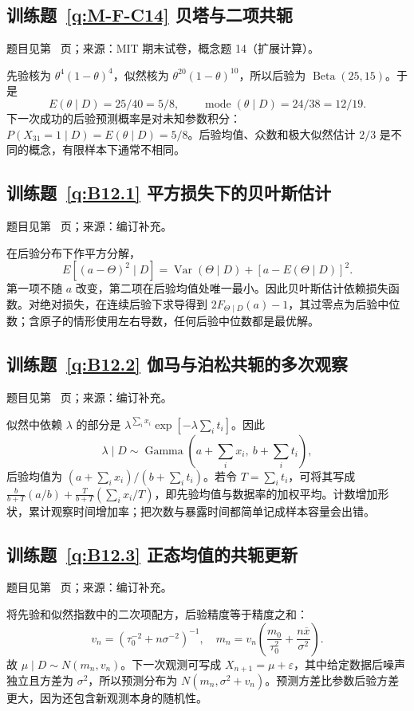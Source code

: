 \subsection*{训练题~\ref{q:M-F-C14} 贝塔与二项共轭}\label{a:M-F-C14}{\small 题目见第~\pageref{q:M-F-C14} 页；来源：MIT 期末试卷，概念题 14（扩展计算）。}
\begin{solve}先验核为 $\theta^4(1-\theta)^4$，似然核为 $\theta^{20}(1-\theta)^{10}$，所以后验为 $\operatorname{Beta}(25,15)$。于是\[E(\theta\mid D)=25/40=5/8,\qquad\operatorname{mode}(\theta\mid D)=24/38=12/19.\]下一次成功的后验预测概率是对未知参数积分：$P(X_{31}=1\mid D)=E(\theta\mid D)=5/8$。后验均值、众数和极大似然估计 $2/3$ 是不同的概念，有限样本下通常不相同。\end{solve}

\subsection*{训练题~\ref{q:B12.1} 平方损失下的贝叶斯估计}\label{a:B12.1}{\small 题目见第~\pageref{q:B12.1} 页；来源：编订补充。}
\begin{solve}在后验分布下作平方分解，\[E[(a-\Theta)^2\mid D]=\operatorname{Var}(\Theta\mid D)+[a-E(\Theta\mid D)]^2.\]第一项不随 $a$ 改变，第二项在后验均值处唯一最小。因此贝叶斯估计依赖损失函数。对绝对损失，在连续后验下求导得到 $2F_{\Theta\mid D}(a)-1$，其过零点为后验中位数；含原子的情形使用左右导数，任何后验中位数都是最优解。\end{solve}

\subsection*{训练题~\ref{q:B12.2} 伽马与泊松共轭的多次观察}\label{a:B12.2}{\small 题目见第~\pageref{q:B12.2} 页；来源：编订补充。}
\begin{solve}似然中依赖 $\lambda$ 的部分是 $\lambda^{\sum_i x_i}\exp[-\lambda\sum_i t_i]$。因此\[\lambda\mid D\sim\operatorname{Gamma}\left(a+\sum_i x_i,\ b+\sum_i t_i\right),\]后验均值为 $(a+\sum_i x_i)/(b+\sum_i t_i)$。若令 $T=\sum_i t_i$，可将其写成 $\frac{b}{b+T}(a/b)+\frac{T}{b+T}(\sum_i x_i/T)$，即先验均值与数据率的加权平均。计数增加形状，累计观察时间增加率；把次数与暴露时间都简单记成样本容量会出错。\end{solve}

\subsection*{训练题~\ref{q:B12.3} 正态均值的共轭更新}\label{a:B12.3}{\small 题目见第~\pageref{q:B12.3} 页；来源：编订补充。}
\begin{solve}将先验和似然指数中的二次项配方，后验精度等于精度之和：\[v_n=\left(\tau_0^{-2}+n\sigma^{-2}\right)^{-1},\quad m_n=v_n\left(\frac{m_0}{\tau_0^2}+\frac{n\overline x}{\sigma^2}\right).\]故 $\mu\mid D\sim N(m_n,v_n)$。下一次观测可写成 $X_{n+1}=\mu+\varepsilon$，其中给定数据后噪声独立且方差为 $\sigma^2$，所以预测分布为 $N(m_n,\sigma^2+v_n)$。预测方差比参数后验方差更大，因为还包含新观测本身的随机性。\end{solve}

